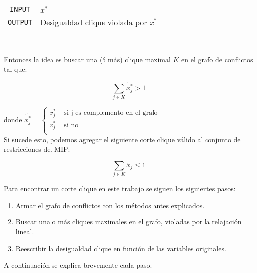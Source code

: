 {
\centering
\begin{tabular}{c l}
\verb_INPUT_ & $x^*$\\
\verb_OUTPUT_ & Desigualdad clique violada por $x^*$\\
\end{tabular}\\
\vspace{5mm}
}

Entonces la idea es buscar una (ó más) clique maximal $K$ en el grafo de conflictos tal que: 

$$\sum_{j\in K}\tilde{x^*_j} > 1$$

donde 
$\tilde{x^*_j} = 
\begin{cases}
\bar{x}^*_j & \text{ si j es complemento en el grafo}\\
x^*_j & \text{ si no}\\
\end{cases}$\\

Si sucede esto, podemos agregar el siguiente corte clique v\'alido al conjunto de restricciones del MIP:

$$\sum_{j\in K}\tilde{x_j} \leq 1$$

Para encontrar un corte clique en este trabajo se siguen los siguientes pasos:

\begin{enumerate}
\item Armar el grafo de conflictos con los métodos antes explicados.
\item Buscar una o m\'as cliques maximales en el grafo, violadas por la relajaci\'on lineal.
\item Reescribir la desigualdad clique en función de las variables originales.
\end{enumerate}

A continuaci\'on se explica brevemente cada paso.

